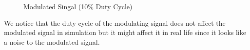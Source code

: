 \documentclass[12pt]{article}
\begin{document}
\begin{figure}[H]
    \centering
    \caption{Modulated Singal (10\% Duty Cycle)}
\end{figure}
We notice that the duty cycle of the modulating signal does not affect the modulated signal in simulation but it might affect it in real life since it looks like a noise to the modulated signal.
\end{document}
